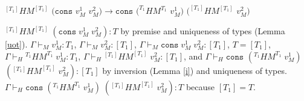 \begin{case}
$^{[T_{1}]}HM^{[T_{1}]}$ $(\mathtt{cons}$ $v_{M}^{1}$ $v_{M}^{2})\rightarrow\mathtt{cons}$ $(^{T_{1}}HM^{T_{1}}$ $v_{M}^{1})$ $(^{[T_{1}]}HM^{[T_{1}]}$ $v_{M}^{2})$

$^{[T_{1}]}HM^{[T_{1}]}\;(\mathtt{cons}\;v_{M}^{1}\;v_{M}^{2}):T$ by premise and uniqueness of types (Lemma \ref{uot}).  $\Gamma\vdash_{M}v_{M}^{1}:T_{1}$, $\Gamma\vdash_{M}v_{M}^{2}:[T_{1}]$, $\Gamma\vdash_{M}\mathtt{cons}\;v_{M}^{1}\;v_{M}^{2}:[T_{1}]$, $T=[T_{1}]$, $\Gamma\vdash_{H}{^{T_{1}}H}M^{T_{1}}\;v_{M}^{1}:T_{1}$, $\Gamma\vdash_{H}{^{[T_{1}]}H}M^{[T_{1}]}\;v_{M}^{2}:[T_{1}]$, and $\Gamma\vdash_{H}\mathtt{cons}$ $(^{T_{1}}HM^{T_{1}}\;v_{M}^{1})$ $(^{[T_{1}]}HM^{[T_{1}]}\;v_{M}^{2}):[T_{1}]$ by inversion (Lemma \ref{i}) and uniqueness of types.  $\Gamma\vdash_{H}\mathtt{cons}\;(^{T_{1}}HM^{T_{1}}\;v_{M}^{1})\;(^{[T_{1}]}HM^{[T_{1}]}\;v_{M}^{2}):T$ because $[T_{1}]=T$.
\end{case}